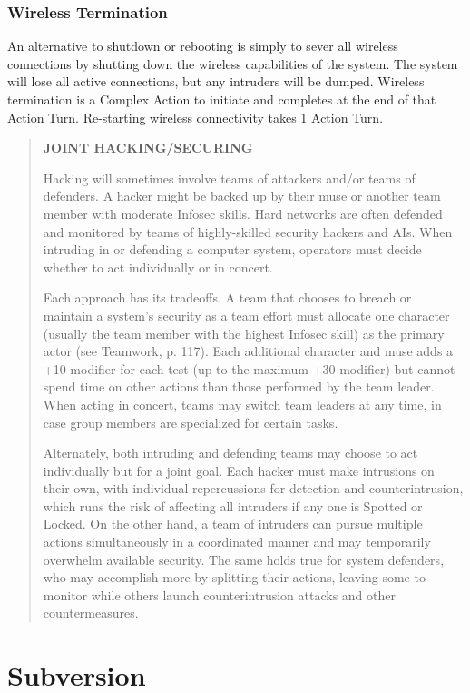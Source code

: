 \subsubsection{Wireless Termination}

An alternative to shutdown or rebooting is simply to 
sever all wireless connections by shutting down the 
wireless capabilities of the system. The system will 
lose all active connections, but any intruders will be 
dumped. Wireless termination is a Complex Action to 
initiate and completes at the end of that Action Turn. 
Re-starting wireless connectivity takes 1 Action Turn.

\begin{quotation}
\textbf{JOINT HACKING/SECURING}

Hacking will sometimes involve teams of attackers
and/or teams of defenders. A hacker might
be backed up by their muse or another team
member with moderate Infosec skills. Hard
networks are often defended and monitored
by teams of highly-skilled security hackers and
AIs. When intruding in or defending a computer
system, operators must decide whether to act
individually or in concert.

Each approach has its tradeoffs. A team that
chooses to breach or maintain a system’s security
as a team effort must allocate one character (usually
the team member with the highest Infosec
skill) as the primary actor (see Teamwork, p. 117).
Each additional character and muse adds a +10
modifier for each test (up to the maximum +30
modifier) but cannot spend time on other actions
than those performed by the team leader. When
acting in concert, teams may switch team leaders
at any time, in case group members are specialized
for certain tasks.

Alternately, both intruding and defending
teams may choose to act individually but for a
joint goal. Each hacker must make intrusions
on their own, with individual repercussions for
detection and counterintrusion, which runs the
risk of affecting all intruders if any one is Spotted
or Locked. On the other hand, a team of intruders
can pursue multiple actions simultaneously in
a coordinated manner and may temporarily overwhelm
available security. The same holds true for
system defenders, who may accomplish more by
splitting their actions, leaving some to monitor
while others launch counterintrusion attacks and
other countermeasures.
\end{quotation}


\section{Subversion}

